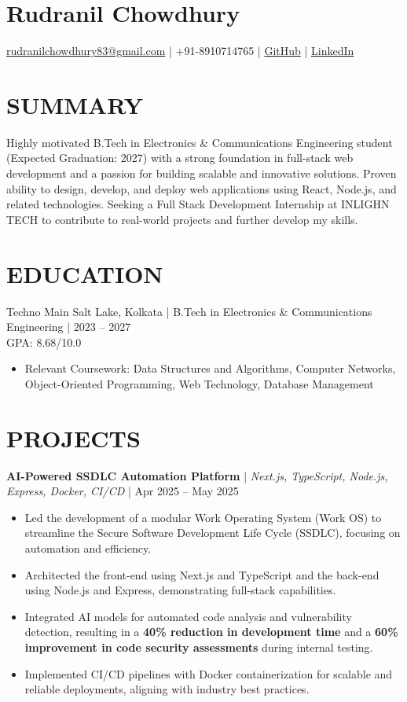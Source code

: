 \documentclass{article}
\begin{document}
\section*{Rudranil Chowdhury}
\href{mailto:rudranilchowdhury83@gmail.com}{rudranilchowdhury83@gmail.com} | +91-8910714765 | \href{https://github.com/}{GitHub} | \href{https://linkedin.com/}{LinkedIn}

\section*{SUMMARY}
Highly motivated B.Tech in Electronics \& Communications Engineering student (Expected Graduation: 2027) with a strong foundation in full-stack web development and a passion for building scalable and innovative solutions. Proven ability to design, develop, and deploy web applications using React, Node.js, and related technologies. Seeking a Full Stack Development Internship at INLIGHN TECH to contribute to real-world projects and further develop my skills.

\section*{EDUCATION}
Techno Main Salt Lake, Kolkata | B.Tech in Electronics \& Communications Engineering | 2023 – 2027 \\
GPA: 8.68/10.0
\begin{itemize}[label=$\bullet$]
    \item Relevant Coursework: Data Structures and Algorithms, Computer Networks, Object-Oriented Programming, Web Technology, Database Management
\end{itemize}

\section*{PROJECTS}
\textbf{AI-Powered SSDLC Automation Platform} | \textit{Next.js, TypeScript, Node.js, Express, Docker, CI/CD} | Apr 2025 – May 2025
\begin{itemize}[label=$\bullet$]
    \item Led the development of a modular Work Operating System (Work OS) to streamline the Secure Software Development Life Cycle (SSDLC), focusing on automation and efficiency.
    \item Architected the front-end using Next.js and TypeScript and the back-end using Node.js and Express, demonstrating full-stack capabilities.
    \item Integrated AI models for automated code analysis and vulnerability detection, resulting in a \textbf{40\% reduction in development time} and a \textbf{60\% improvement in code security assessments} during internal testing.
    \item Implemented CI/CD pipelines with Docker containerization for scalable and reliable deployments, aligning with industry best practices.
\end{itemize}
\end{document}
